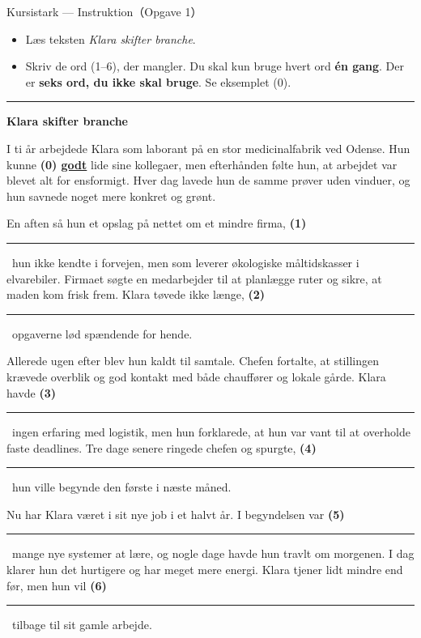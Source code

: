 \begin{emailbox}{Kursistark --- Instruktion（Opgave 1）}
\begin{itemize}
  \item Læs teksten \textit{Klara skifter branche}.
  \item Skriv de ord (1--6), der mangler. Du skal kun bruge hvert ord \textbf{én gang}. Der er \textbf{seks ord, du ikke skal bruge}. Se eksemplet (0).
\end{itemize}

\vspace{0.35em}
\hrule
\vspace{0.45em}

\textbf{\color{NCDNavy}Klara skifter branche}

\vspace{0.3em}
I ti år arbejdede Klara som laborant på en stor medicinalfabrik ved Odense. Hun kunne \textbf{(0) \underline{godt}} lide sine kollegaer, men efterhånden følte hun, at arbejdet var blevet alt for ensformigt. Hver dag lavede hun de samme prøver uden vinduer, og hun savnede noget mere konkret og grønt.

\vspace{0.25em}
En aften så hun et opslag på nettet om et mindre firma, \textbf{(1)}\ \rule{2.1cm}{0.4pt}\ hun ikke kendte i forvejen, men som leverer økologiske måltidskasser i elvarebiler. Firmaet søgte en medarbejder til at planlægge ruter og sikre, at maden kom frisk frem. Klara tøvede ikke længe, \textbf{(2)}\ \rule{2.1cm}{0.4pt}\ opgaverne lød spændende for hende.

\vspace{0.25em}
Allerede ugen efter blev hun kaldt til samtale. Chefen fortalte, at stillingen krævede overblik og god kontakt med både chauffører og lokale gårde. Klara havde \textbf{(3)}\ \rule{2.1cm}{0.4pt}\ ingen erfaring med logistik, men hun forklarede, at hun var vant til at overholde faste deadlines. Tre dage senere ringede chefen og spurgte, \textbf{(4)}\ \rule{2.1cm}{0.4pt}\ hun ville begynde den første i næste måned.

\vspace{0.25em}
Nu har Klara været i sit nye job i et halvt år. I begyndelsen var \textbf{(5)}\ \rule{2.1cm}{0.4pt}\ mange nye systemer at lære, og nogle dage havde hun travlt om morgenen. I dag klarer hun det hurtigere og har meget mere energi. Klara tjener lidt mindre end før, men hun vil \textbf{(6)}\ \rule{2.1cm}{0.4pt}\ tilbage til sit gamle arbejde.
\end{emailbox}

